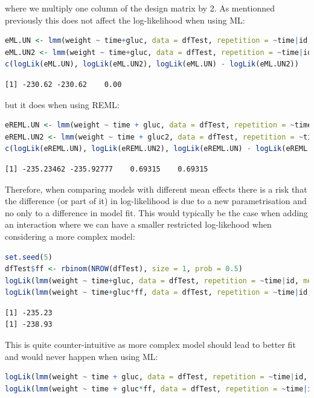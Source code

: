\documentclass[12pt]{article}
\begin{document}
\noindent where we multiply one column of the design matrix by 2. As mentionned
previously this does not affect the log-likelihood when using ML:
\begin{lstlisting}[language=r,numbers=none]
eML.UN <- lmm(weight ~ time+gluc, data = dfTest, repetition = ~time|id, method = "ML")
eML.UN2 <- lmm(weight ~ time+gluc, data = dfTest, repetition = ~time|id, method = "ML")
c(logLik(eML.UN), logLik(eML.UN2), logLik(eML.UN) - logLik(eML.UN2))
\end{lstlisting}

\label{}
\begin{verbatim}
[1] -230.62 -230.62    0.00
\end{verbatim}


but it does when using REML:
\begin{lstlisting}[language=r,numbers=none]
eREML.UN <- lmm(weight ~ time + gluc, data = dfTest, repetition = ~time|id, method = "REML")
eREML.UN2 <- lmm(weight ~ time + gluc2, data = dfTest, repetition = ~time|id, method = "REML")
c(logLik(eREML.UN), logLik(eREML.UN2), logLik(eREML.UN) - logLik(eREML.UN2), log(2))
\end{lstlisting}

\label{}
\begin{verbatim}
[1] -235.23462 -235.92777    0.69315    0.69315
\end{verbatim}



Therefore, when comparing models with different mean effects there is
a risk that the difference (or part of it) in log-likelihood is due to
a new parametrisation and no only to a difference in model fit. This
would typically be the case when adding an interaction where we can
have a smaller restricted log-likehood when considering a more complex
model:

\begin{lstlisting}[language=r,numbers=none]
set.seed(5) 
dfTest$ff <- rbinom(NROW(dfTest), size = 1, prob = 0.5)
logLik(lmm(weight ~ time+gluc, data = dfTest, repetition = ~time|id, method = "REML"))
logLik(lmm(weight ~ time+gluc*ff, data = dfTest, repetition = ~time|id, method = "REML"))
\end{lstlisting}

\label{}
\begin{verbatim}
[1] -235.23
[1] -238.93
\end{verbatim}


This is quite counter-intuitive as more complex model should lead to
better fit and would never happen when using ML:
\begin{lstlisting}[language=r,numbers=none]
logLik(lmm(weight ~ time + gluc, data = dfTest, repetition = ~time|id, method = "ML"))
logLik(lmm(weight ~ time + gluc*ff, data = dfTest, repetition = ~time|id, method = "ML"))
\end{lstlisting}
\end{document}
